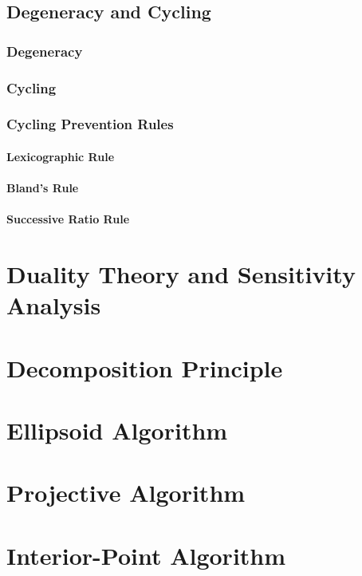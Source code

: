 		\section{Degeneracy and Cycling}
			\subsection{Degeneracy}

			\subsection{Cycling}

			\subsection{Cycling Prevention Rules}
				\subsubsection{Lexicographic Rule}

				\subsubsection{Bland's Rule}

				\subsubsection{Successive Ratio Rule}

	\chapter{Duality Theory and Sensitivity Analysis}

	\chapter{Decomposition Principle}

	\chapter{Ellipsoid Algorithm}

	\chapter{Projective Algorithm}

	\chapter{Interior-Point Algorithm}